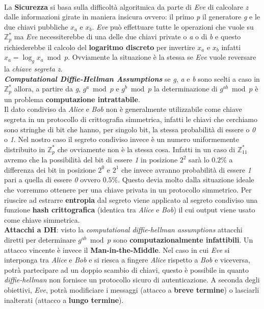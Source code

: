 \\
La \textbf{Sicurezza} si basa sulla difficoltà algoritmica da parte di \textit{Eve} di calcolare \textit{z} dalle informazioni girate in maniera insicura ovvero: il primo \textit{p} il generatore \textit{g} e le due chiavi pubbliche $x_a$ e $x_b$. \textit{Eve} può effettuare tutte le operazioni che vuole su $\mathbb{Z}_p^*$ ma \textit{Eve} necessiterebbe di una delle due chiavi private o \textit{a} o di \textit{b} e questo richiederebbe il calcolo del \textbf{logaritmo discreto} per invertire $x_a$ e $x_b$ infatti $x_a = \log_{g}{x_a} \bmod p$. Ovviamente la situazione è la stessa se \textit{Eve} vuole reversare la \textit{chiave segreta z}.
\\ \newline
\textbf{\textit{Computational Diffie-Hellman Assumptions}} se \textit{g}, \textit{a} e \textit{b} sono scelti a caso in $\mathbb{Z}_p^*$ allora, a partire da \textit{g}, $g^a \bmod p$ e $g^b \bmod p$ la determinazione di $g^{ab} \bmod p$ è un problema \textbf{computazione intrattabile}. \\
Il dato condiviso da \textit{Alice} e \textit{Bob} non è generalmente utilizzabile come chiave segreta in un protocollo di crittografia simmetrica, infatti le chiavi che cerchiamo sono stringhe di bit che hanno, per singolo bit, la stessa probabilità di essere o \textit{0} o \textit{1}. Nel nostro caso il segreto condiviso invece è un numero uniformemente distribuito in $\mathbb{Z}_p^*$ che ovviamente non è la stessa cosa. Infatti in un caso di $\mathbb{Z}_{11}^*$ avremo che la possibilità del bit di essere \textit{1} in posizione $2^2$ sarà lo $0.2\%$ a differenza dei bit in posizione $2^0$ e $2^1$ che invece avranno probabilità di essere \textit{1} pari a quella di essere \textit{0} ovvero $0.5\%$. Questo devia molto dalla situazione ideale che vorremmo ottenere per una chiave privata in un protocollo simmetrico. Per riuscire ad estrarre \textbf{entropia} dal segreto viene applicato al segreto condiviso una funzione \textbf{hash crittografica} (identica tra \textit{Alice} e \textit{Bob}) il cui output viene usato come chiave simmetrica.
\\ \newline
\textbf{Attacchi a DH}: visto la \textit{computational diffie-hellman assumptions} attacchi diretti per determinare $g^{ab} \bmod p$ sono \textbf{computazionalmente infattibili}. Un attacco vincente è invece il \textbf{Man-in-the-Middle}. Nel caso in cui \textit{Eve} si interponga tra \textit{Alice} e \textit{Bob} e si riesca a fingere \textit{Alice} rispetto a \textit{Bob} e viceversa, potrà partecipare ad un doppio scambio di chiavi, questo è possibile in quanto \textit{diffie-hellman} non fornisce un protocollo sicuro di autenticazione. A seconda degli obiettivi, \textit{Eve}, potrà modificiare i messaggi (attacco a \textbf{breve termine}) o lasciarli inalterati (attacco a \textbf{lungo termine}). 
